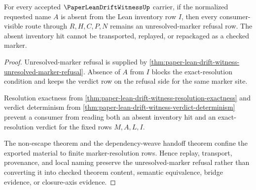 \begin{theorem}
\label{thm:paper-lean-drift-witness-inventory-refusal-readiness}
For every accepted $\PaperLeanDriftWitnessUp$ carrier, if the normalized requested name $A$ is absent from the Lean inventory row $I$, then every consumer-visible route through $R,H,C,P,N$ remains an unresolved-marker refusal row. The absent inventory hit cannot be transported, replayed, or repackaged as a checked marker.
\end{theorem}
\begin{proof}
Unresolved-marker refusal is supplied by \autoref{thm:paper-lean-drift-witness-unresolved-marker-refusal}. Absence of $A$ from $I$ blocks the exact-resolution condition and keeps the verdict row on the refusal side for the same marker site.

Resolution exactness from \autoref{thm:paper-lean-drift-witness-resolution-exactness} and verdict determinism from \autoref{thm:paper-lean-drift-witness-verdict-determinism} prevent a consumer from reading both an absent inventory hit and an exact-resolution verdict for the fixed rows $M,A,L,I$.

The non-escape theorem and the dependency-weave handoff theorem confine the exported material to finite marker-resolution rows. Hence replay, transport, provenance, and local naming preserve the unresolved-marker refusal rather than converting it into checked theorem content, semantic equivalence, bridge evidence, or closure-axis evidence.
\end{proof}

